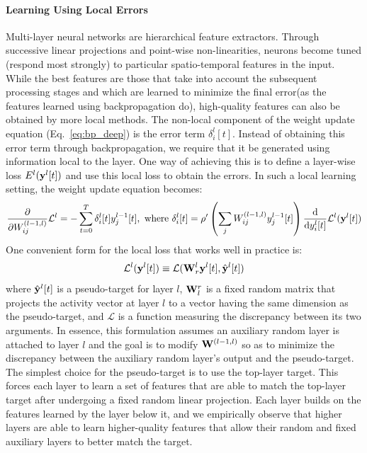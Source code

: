 \documentclass[journal,onecolumn,11pt]{IEEEtran}
\begin{document}
\paragraph{Learning Using Local Errors} Multi-layer neural networks are hierarchical feature extractors.
Through successive linear projections and point-wise non-linearities, neurons become tuned (respond most strongly) to particular spatio-temporal features in the input.
While the best features are those that take into account the subsequent processing stages and which are learned to minimize the final error(as the features learned using backpropagation do), high-quality features can also be obtained by more local methods.
The non-local component of the weight update equation (Eq.~\ref{eq:bp_deep}) is the error term $\delta_i^l[t]$.
Instead of obtaining this error term through backpropagation, we require that it be generated using information local to the layer. 
One way of achieving this is to define a layer-wise loss $E^l({\bf y}^l[t])$ and use this local loss to obtain the errors.
In such a local learning setting, the weight update equation becomes:
%
\begin{equation}\label{eq:bp_local}
  \frac{\mathrm{\partial}}{\mathrm{\partial} W^{(l-1,l)}_{ij}} \mathcal{L}^l = -\sum_{t=0}^T \delta_{i}^{l}[t]  y^{l-1}_j[t],
    \text{ where }
    \delta_{i}^{l} [t] = \rho'\left(\sum_j W^{(l-1,l)}_{ij} y^{l-1}_j [t] \right) \frac{\mathrm{d}}{\mathrm{d}y_i^l[t]}\mathcal{L}^l({\bf y}^l[t])
\end{equation}
One convenient form for the local loss that works well in practice is:
\begin{equation}
\mathcal{L}^l({\bf y}^l[t]) \equiv \mathcal{L}({\bf W}^l_{r} {\bf y}^l[t],\hat{{\bf y}}^{l}[t])
\end{equation}
%
where $\hat{{\bf y}}^{l}[t]$ is a pseudo-target for layer $l$, ${\bf W}_l^{r}$ is a fixed random matrix that projects the activity vector at layer $l$ to a vector having the same dimension as the pseudo-target, and $\mathcal{L}$ is a function measuring the discrepancy between its two arguments.
In essence, this formulation assumes an auxiliary random layer is attached to layer $l$ and the goal is to modify ${\bf W}^{(l-1,l)}$ so as to minimize the discrepancy between the auxiliary random layer's output and the pseudo-target. 
The simplest choice for the pseudo-target is to use the top-layer target. 
This forces each layer to learn a set of features that are able to match the top-layer target after undergoing a fixed random linear projection. Each layer builds on the features learned by the layer below it, and we empirically observe that higher layers are able to learn higher-quality features that allow their random and fixed auxiliary layers to better match the target.
\label{sec:spatial_credit_assignment}
\end{document}
